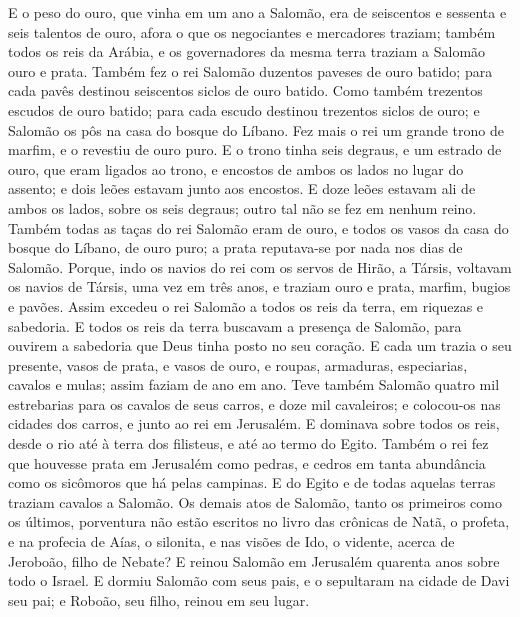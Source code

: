 E o peso do ouro, que vinha em um ano a Salomão, era de
seiscentos e sessenta e seis talentos de ouro, afora o que os
negociantes e mercadores traziam; também todos os reis da Arábia, e
os governadores da mesma terra traziam a Salomão ouro e prata.
Também fez o rei Salomão duzentos paveses de ouro batido;
para cada pavês destinou seiscentos siclos de ouro batido.
Como também trezentos escudos de ouro batido; para cada
escudo destinou trezentos siclos de ouro; e Salomão os pôs na casa
do bosque do Líbano. Fez mais o rei um grande trono de
marfim, e o revestiu de ouro puro. E o trono tinha seis
degraus, e um estrado de ouro, que eram ligados ao trono, e encostos
de ambos os lados no lugar do assento; e dois leões estavam junto
aos encostos. E doze leões estavam ali de ambos os lados,
sobre os seis degraus; outro tal não se fez em nenhum reino.
Também todas as taças do rei Salomão eram de ouro, e todos os
vasos da casa do bosque do Líbano, de ouro puro; a prata reputava-se
por nada nos dias de Salomão. Porque, indo os navios do rei
com os servos de Hirão, a Társis, voltavam os navios de Társis, uma
vez em três anos, e traziam ouro e prata, marfim, bugios e pavões.
Assim excedeu o rei Salomão a todos os reis da terra, em
riquezas e sabedoria. E todos os reis da terra buscavam a
presença de Salomão, para ouvirem a sabedoria que Deus tinha posto
no seu coração. E cada um trazia o seu presente, vasos de
prata, e vasos de ouro, e roupas, armaduras, especiarias, cavalos e
mulas; assim faziam de ano em ano. Teve também Salomão quatro
mil estrebarias para os cavalos de seus carros, e doze mil
cavaleiros; e colocou-os nas cidades dos carros, e junto ao rei em
Jerusalém. E dominava sobre todos os reis, desde o rio até à
terra dos filisteus, e até ao termo do Egito. Também o rei
fez que houvesse prata em Jerusalém como pedras, e cedros em tanta
abundância como os sicômoros que há pelas campinas. E do
Egito e de todas aquelas terras traziam cavalos a Salomão. Os
demais atos de Salomão, tanto os primeiros como os últimos,
porventura não estão escritos no livro das crônicas de Natã, o
profeta, e na profecia de Aías, o silonita, e nas visões de Ido, o
vidente, acerca de Jeroboão, filho de Nebate? E reinou
Salomão em Jerusalém quarenta anos sobre todo o Israel. E
dormiu Salomão com seus pais, e o sepultaram na cidade de Davi seu
pai; e Roboão, seu filho, reinou em seu lugar.

\medskip

